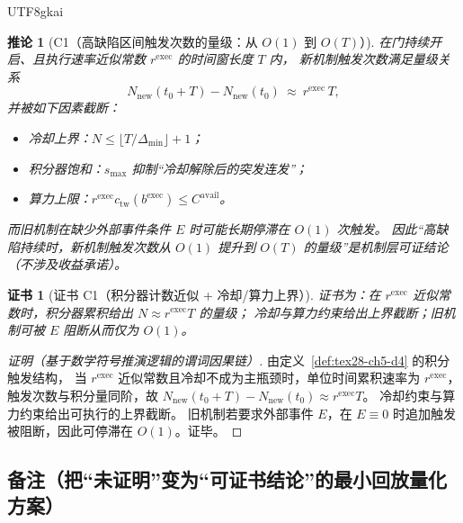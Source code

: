 \documentclass[12pt]{article}
\newtheorem{corollary}{推论}[section]
\newtheorem{Certificate}{证书}[section]
\begin{document}
\begin{CJK*}{UTF8}{gkai}
\begin{corollary}[C1（高缺陷区间触发次数的量级：从 $O(1)$ 到 $O(T)$）]
\label{cor:tex28-ch5-c1}
在门持续开启、且执行速率近似常数 $r^{\mathrm{exec}}$ 的时间窗长度 $T$ 内，
新机制触发次数满足量级关系
\[
  N_{\mathrm{new}}(t_0+T)-N_{\mathrm{new}}(t_0)\ \approx\ r^{\mathrm{exec}}\,T,
\]
并被如下因素截断：
\begin{itemize}
  \item 冷却上界：$N\le \lfloor T/\Delta_{\min}\rfloor+1$；
  \item 积分器饱和：$s_{\max}$ 抑制“冷却解除后的突发连发”；
  \item 算力上限：$r^{\mathrm{exec}}c_{\mathrm{tw}}(b^{\mathrm{exec}})\le C^{\mathrm{avail}}$。
\end{itemize}
而旧机制在缺少外部事件条件 $E$ 时可能长期停滞在 $O(1)$ 次触发。
因此“高缺陷持续时，新机制触发次数从 $O(1)$ 提升到 $O(T)$ 的量级”是机制层可证结论（不涉及收益承诺）。
\end{corollary}

\begin{Certificate}[证书 C1（积分器计数近似 + 冷却/算力上界）]
\label{cert:tex28-ch5-c1}
证书为：在 $r^{\mathrm{exec}}$ 近似常数时，积分器累积给出 $N\approx r^{\mathrm{exec}}T$ 的量级；
冷却与算力约束给出上界截断；旧机制可被 $E$ 阻断从而仅为 $O(1)$。
\end{Certificate}

\begin{proof}[证明（基于数学符号推演逻辑的谓词因果链）]
由定义~\ref{def:tex28-ch5-d4} 的积分触发结构，
当 $r^{\mathrm{exec}}$ 近似常数且冷却不成为主瓶颈时，单位时间累积速率为 $r^{\mathrm{exec}}$，
触发次数与积分量同阶，故 $N_{\mathrm{new}}(t_0+T)-N_{\mathrm{new}}(t_0)\approx r^{\mathrm{exec}}T$。
冷却约束与算力约束给出可执行的上界截断。
旧机制若要求外部事件 $E$，在 $E\equiv 0$ 时追加触发被阻断，因此可停滞在 $O(1)$。证毕。
\end{proof}

\subsection{备注（把“未证明”变为“可证书结论”的最小回放量化方案）}
\label{subsec:tex28-ch5-remarks}


\end{CJK*}
\end{document}
